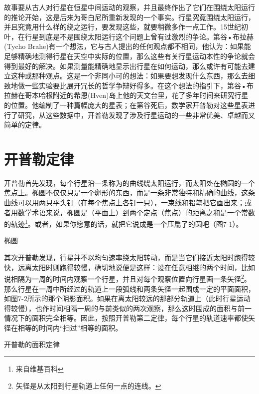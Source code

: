 \documentclass[12pt,oneside]{book}
\begin{document}
故事要从古人对行星在恒星中间运动的观察，并且最终作出了它们在围绕太阳运行的推论开始，这是后来为哥白尼所重新发现的一个事实。行星究竟围绕太阳运行，并且究竟用什么样的绕之运行，要发现这些，就要稍微多作一点工作。15世纪初叶，在行星到底是不是围绕太阳运行这个问题上曾有过激烈的争论。第谷•布拉赫(Tycho Brahe)有一个想法，它与古人提出的任何观点都不相同，他认为：如果能足够精确地测得行星在天空中实际的位置，那么这些有关行星运动本性的争论就会得到最好的解决。如果测量能精确地显示出行星在如何运动，那么或许有可能去建立这种或那种观点。这是一个非同小可的想法：如果要想发现什么东西，那么去细致地做一些实验要比展开冗长的哲学争辩好得多。在这个想法的指引下，第谷•布拉赫在哥本哈根附近的希恩(Hven)岛上他的天文台里，花了多年时间来研究行星的位置。他编制了一种篇幅庞大的星表；在第谷死后，数学家开普勒对这些星表进行了研究，从这些数据中，开普勒发现了涉及行星运动的一些非常优美、卓越而又简单的定律。



\section{开普勒定律}
开普勒首先发现，每个行星沿一条称为的曲线绕太阳运行，而太阳处在椭圆的一个焦点上。椭圆不仅仅只是一个卵形的东西，而是一条非常独特和精确的曲线，这条曲线可以用两只平头钉（在每个焦点上各钉一只），一束线和铅笔把它画出来；或者用数学术语来说，椭圆是（平面上）到两个定点（焦点）的距离之和是一个常数的轨迹\footnote{来自维基百科}。或者，如果你愿意的话，就把它说成是一个压扁了的圆吧（图7-1）。
\begin{fig}{椭圆}
\caption{椭圆}
\label{fig:椭圆}
\end{fig}

其次开普勒发现，行星并不以均匀速率绕太阳转动，而是当它们接近太阳时跑得较快，远离太阳时则跑得较慢，确切地说便是这样：设在任意相继的两个时间，比如说相隔为一周的时间内观察一个行星，并且对每个观察位置向行星画一条矢径\footnote{矢径是从太阳到行星轨道上任何一点的连线。}。那么行星在一周中所经过的轨道上一段弧线和两条矢径一起围成一定的平面面积，如图7-2所示的那个阴影面积。如果在离太阳较远的那部分轨道上（此时行星运动得较慢），也作时间相隔一周的与前类似的两次观察，那么这时围成的面积与前一情况下的面积完全相等。因此，按照开普勒第二定律，每个行星的轨道速率都使矢径在相等的时间内“扫过”相等的面积。
\begin{fig}{开普勒的面积定律}
\caption{开普勒的面积定律}
\label{fig:开普勒的面积定律}
\end{fig}
\end{document}
